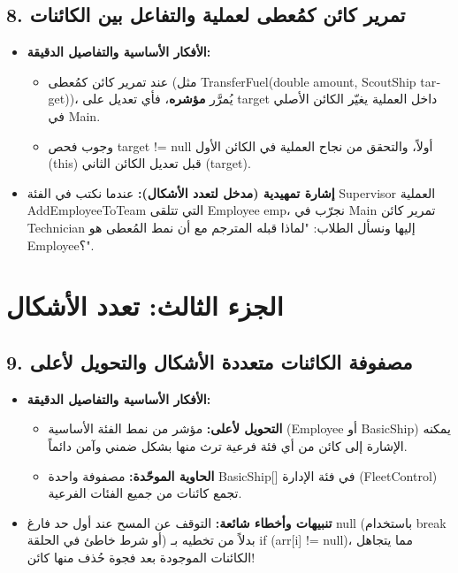 \documentclass[14pt]{extarticle}
\begin{document}
\filbreak
\subsection*{8. تمرير كائن كمُعطى لعملية والتفاعل بين الكائنات}
\begin{itemize}[itemsep=0.3em]
    \item \textbf{الأفكار الأساسية والتفاصيل الدقيقة:}
    \begin{itemize}
        \item عند تمرير كائن كمُعطى (مثل \textenglish{TransferFuel(double amount, ScoutShip target)})، يُمرَّر \textbf{مؤشره}، فأي تعديل على \textenglish{target} داخل العملية يغيّر الكائن الأصلي في \textenglish{Main}.
        \item وجوب فحص \textenglish{target != null} أولاً، والتحقق من نجاح العملية في الكائن الأول (\textenglish{this}) قبل تعديل الكائن الثاني (\textenglish{target}).
    \end{itemize}
    \item \textbf{إشارة تمهيدية (مدخل لتعدد الأشكال):} عندما نكتب في الفئة \textenglish{Supervisor} العملية \\
    \textenglish{AddEmployeeToTeam} التي تتلقى \textenglish{Employee emp}، نجرّب في \textenglish{Main} تمرير كائن \textenglish{Technician} إليها ونسأل الطلاب: "لماذا قبله المترجم مع أن نمط المُعطى هو \textenglish{Employee}؟".
\end{itemize}

\clearpage

\section*{الجزء الثالث: تعدد الأشكال}

\subsection*{9. مصفوفة الكائنات متعددة الأشكال والتحويل لأعلى}
\begin{itemize}[itemsep=0.3em]
    \item \textbf{الأفكار الأساسية والتفاصيل الدقيقة:}
    \begin{itemize}
        \item \textbf{التحويل لأعلى:} مؤشر من نمط الفئة الأساسية (\textenglish{Employee} أو \textenglish{BasicShip}) يمكنه الإشارة إلى كائن من أي فئة فرعية ترث منها بشكل ضمني وآمن دائماً.
        \item \textbf{الحاوية الموحّدة:} مصفوفة واحدة \textenglish{BasicShip[]} في فئة الإدارة (\textenglish{FleetControl}) تجمع كائنات من جميع الفئات الفرعية.
    \end{itemize}
    \item \textbf{تنبيهات وأخطاء شائعة:} التوقف عن المسح عند أول حد فارغ \textenglish{null} (باستخدام \textenglish{break} أو شرط خاطئ في الحلقة) بدلاً من تخطيه بـ \textenglish{if (arr[i] != null)}، مما يتجاهل الكائنات الموجودة بعد فجوة حُذف منها كائن!
\end{itemize}
\end{document}
